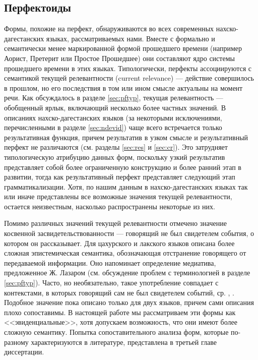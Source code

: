 \subsection{Перфектоиды} \label{sec:perf}
\color{black}
Формы, похожие на перфект, обнаруживаются во всех современных нахско-дагестанских языках, рассматриваемых нами. Вместе с формально и семантически менее маркированной формой прошедшего времени (например Аорист, Претерит или Простое Прошедшее) они составляют ядро системы прошедшего времени в этих языках. Типологически, перфекты ассоциируются с семантикой текущей релевантности (current relevance) --- действие совершилось в прошлом, но  его последствия в том или ином смысле актуальны на момент речи. Как обсуждалось в разделе \ref{sec:pftyp}, текущая релевантность --- обобщенный ярлык, включающий несколько более частных значений. В описаниях нахско-дагестанских языков (за некоторыми исключениями, перечисленными в разделе \ref{sec:ndevid}) чаще всего встречается только результативная функция, причем результатив в узком смысле и результативный перфект не различаются (см. разделы \ref{sec:res} и \ref{sec:cr}). Это затрудняет типологическую атрибуцию данных форм, поскольку узкий результатив представляет собой более ограниченную конструкцию и более ранний этап в развитии, тогда как результативный перфект представляет следующий этап грамматикализации. Хотя, по нашим данным в нахско-дагестанских языках так или иначе представлены все возможные значения текущей релевантности, остается неизвестным, насколько распространены некоторые из них.
\par Помимо различных значений текущей релевантности отмечено значение косвенной засвидетельствованности --- говорящий не был свидетелем события, о котором он рассказывает. Для цахурского и лакского языков описана более сложная эпистемическая семантика, обозначающая отстранение говорящего от передаваемой информации. Оно напоминает определение медиатива, предложенное Ж. Лазаром (см. обсуждение проблем с терминологией в разделе \ref{sec:pftyp}). Часто, но необязательно, такое употребление совпадает с контекстами, в которых говорящий сам не был свидетелем событий, ср. \citep{friedman2000}, \citep{maisaktatevosov2007}. Подобное значение пока описано только для двух языков, причем сами описания плохо сопоставимы. В настоящей работе мы рассматриваем эти формы как <<эвиденциальные>>, хотя допускаем возможность, что они имеют более сложную семантику. Попытка сопоставительного анализа форм, которые по-разному характеризуются в литературе, представлена в третьей главе диссертации.
